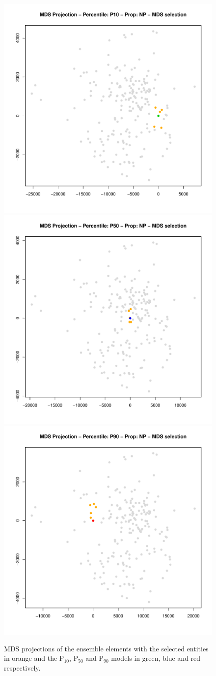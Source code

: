 \documentclass[final,5p,times,twocolumn]{elsarticle}
\begin{document}
\begin{figure}[H]
  \centering
  \includegraphics[height=0.49\columnwidth]{figures/mds-sel-p10.pdf}
  \includegraphics[height=0.49\columnwidth]{figures/mds-sel-p50.pdf}
  \includegraphics[height=0.49\columnwidth]{figures/mds-sel-p90.pdf}
  \caption{MDS projections of the ensemble elements with the selected entities in orange and the P$_{10}$, P$_{50}$ and P$_{90}$ models in green, blue and red respectively.}
  \label{fig:mds-sel}
\end{figure}
\end{document}
